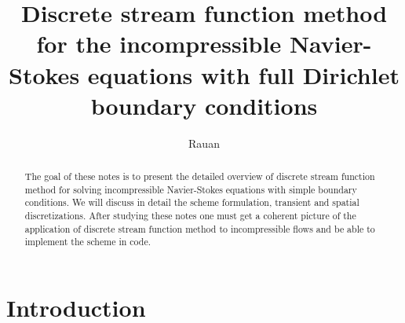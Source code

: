 \documentclass{article}
\title{Discrete stream function method for the incompressible Navier-Stokes equations with full Dirichlet boundary conditions}
\author{Rauan}
\numberwithin{equation}{section}
\begin{document}
\maketitle

\begin{abstract}
The goal of these notes is to present the detailed overview of discrete stream function method for solving incompressible Navier-Stokes equations with simple boundary conditions. We will discuss in detail the scheme formulation, transient and spatial discretizations.  After studying these notes one must get a coherent picture of the application of discrete stream function method to incompressible flows and be able to implement the scheme in code.
\end{abstract}

\tableofcontents

\section{Introduction}\label{sec:introduction}
\end{document}
